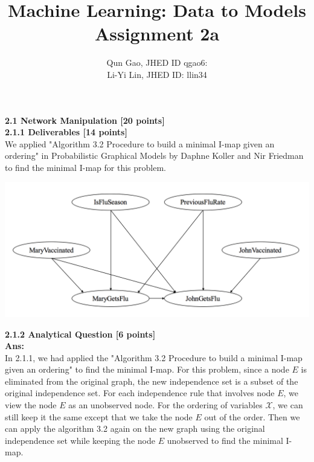 \documentclass[letterpaper, 11pt]{article}
\title{Machine Learning: Data to Models \\Assignment 2a}
\author{Qun Gao, JHED ID qgao6: \\Li-Yi Lin, JHED ID: llin34}
\date{}
\begin{document}
\maketitle
\noindent \Large \textbf{2.1 Network Manipulation [20 points]}\\
\large \textbf{2.1.1 Deliverables [14 points]}\\
We applied "Algorithm 3.2 Procedure to build a minimal I-map given an ordering" in Probabilistic Graphical Models by Daphne Koller and Nir Friedman to find the minimal I-map for this problem.\\
\begin{center}
\includegraphics[scale=0.6]{i-map}
\end{center}

\noindent
\large \textbf{2.1.2 Analytical Question [6 points]}\\
\textbf{Ans:}\\
In 2.1.1, we had applied the "Algorithm 3.2 Procedure to build a minimal I-map given an ordering" to find the minimal I-map. For this problem, since a node $E$ is eliminated from the original graph, the new independence set is a subset of the original independence set. For each independence rule that involves node $E$, we view the node $E$ as an unobserved node. For the ordering of variables $\mathcal{X}$, we can still keep it the same except that we take the node $E$ out of the order. Then we can apply the algorithm 3.2 again on the new graph using the original independence set while keeping the node $E$ unobserved to find the minimal I-map.\\
\end{document}
